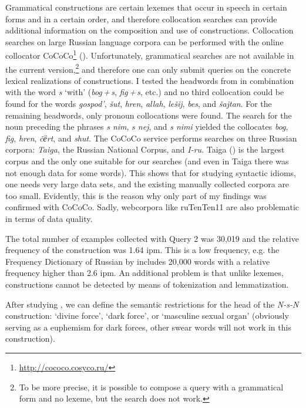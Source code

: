 \documentclass[output=paper]{langscibook}
\begin{document}
Grammatical constructions are certain lexemes that occur in speech in certain forms and in a certain order, and therefore collocation searches can provide additional information on the composition and use of constructions. Collocation searches on large Russian language corpora can be performed with the online collocator CoCoCo\footnote{\url{http://cococo.cosyco.ru/}} (\citealt{KopotevEtAl2016,Kormacheva2020}). Unfortunately, grammatical searches are not available in the current version,\footnote{To be more precise, it is possible to compose a query with a grammatical form and no lexeme, but the search does not work.} and therefore one can only submit queries on the concrete lexical realizations of constructions. I tested the headwords from  in combination with the word \textit{s} ‘with’ (\textit{bog\,+\,s}, \textit{fig\,+\,s}, etc.) and no third collocation could be found for the words \textit{gospod’}, \textit{šut}, \textit{hren}, \textit{allah}, \textit{lešij}, \textit{bes}, and \textit{šajtan}. For the remaining headwords, only pronoun collocations were found. The search for the noun preceding the phrases \textit{s nim}, \textit{s nej}, and \textit{s nimi} yielded the collocates \textit{bog}, \textit{fig}, \textit{hren}, \textit{č{ёrt}}, and \textit{shut}. The CoCoCo service performs searches on three Russian corpora: \textit{Taiga}, the Russian National Corpus, and \textit{I-ru}. Taiga (\citealt{ShavrinaShapovalova2017}) is the largest corpus and the only one suitable for our searches (and even in Taiga there was not enough data for some words). This shows that for studying syntactic idioms, one needs very large data sets, and the existing manually collected corpora are too small. Evidently, this is the reason why only part of my findings was confirmed with CoCoCo. Sadly, webcorpora like ruTenTen11 are also problematic in terms of data quality.

The total number of examples collected with Query 2 was 30,019 and the relative frequency of the construction was 1.64 ipm. This is a low frequency, e.g. the Frequency Dictionary of Russian by \citet{LjashevskajaSharov2009} includes 20,000 words with a relative frequency higher than 2.6 ipm. An additional problem is that unlike lexemes, constructions cannot be detected by means of tokenization and lemmatization.

After studying , we can define the semantic restrictions for the head of the \textit{N-s-N} construction: ‘divine force’, ‘dark force’, or ‘masculine sexual organ’ (obviously serving as a euphemism for dark forces, other swear words will not work in this construction).
\end{document}
